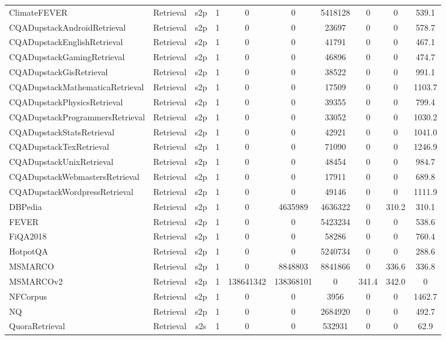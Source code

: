 \documentclass[11pt]{article}
\begin{document}
\begin{table*}[!t]
{\begin{tabular}{l|ccccccccc}
ClimateFEVER & Retrieval & s2p & 1 & 0 & 0 & 5418128 & 0 & 0 & 539.1  \\
CQADupstackAndroidRetrieval & Retrieval & s2p & 1 & 0 & 0 & 23697 & 0 & 0 & 578.7  \\
CQADupstackEnglishRetrieval & Retrieval & s2p & 1 & 0 & 0 & 41791 & 0 & 0 & 467.1  \\
CQADupstackGamingRetrieval & Retrieval & s2p & 1 & 0 & 0 & 46896 & 0 & 0 & 474.7  \\
CQADupstackGisRetrieval & Retrieval & s2p & 1 & 0 & 0 & 38522 & 0 & 0 & 991.1  \\
CQADupstackMathematicaRetrieval & Retrieval & s2p & 1 & 0 & 0 & 17509 & 0 & 0 & 1103.7  \\
CQADupstackPhysicsRetrieval & Retrieval & s2p & 1 & 0 & 0 & 39355 & 0 & 0 & 799.4  \\
CQADupstackProgrammersRetrieval & Retrieval & s2p & 1 & 0 & 0 & 33052 & 0 & 0 & 1030.2  \\
CQADupstackStatsRetrieval & Retrieval & s2p & 1 & 0 & 0 & 42921 & 0 & 0 & 1041.0  \\
CQADupstackTexRetrieval & Retrieval & s2p & 1 & 0 & 0 & 71090 & 0 & 0 & 1246.9  \\
CQADupstackUnixRetrieval & Retrieval & s2p & 1 & 0 & 0 & 48454 & 0 & 0 & 984.7  \\
CQADupstackWebmastersRetrieval & Retrieval & s2p & 1 & 0 & 0 & 17911 & 0 & 0 & 689.8  \\
CQADupstackWordpressRetrieval & Retrieval & s2p & 1 & 0 & 0 & 49146 & 0 & 0 & 1111.9  \\
DBPedia & Retrieval & s2p & 1 & 0 & 4635989 & 4636322 & 0 & 310.2 & 310.1  \\
FEVER & Retrieval & s2p & 1 & 0 & 0 & 5423234 & 0 & 0 & 538.6  \\
FiQA2018 & Retrieval & s2p & 1 & 0 & 0 & 58286 & 0 & 0 & 760.4  \\
HotpotQA & Retrieval & s2p & 1 & 0 & 0 & 5240734 & 0 & 0 & 288.6  \\
MSMARCO & Retrieval & s2p & 1 & 0 & 8848803 & 8841866 & 0 & 336.6 & 336.8  \\
MSMARCOv2 & Retrieval & s2p & 1 & 138641342 & 138368101 & 0 & 341.4 & 342.0 & 0  \\
NFCorpus & Retrieval & s2p & 1 & 0 & 0 & 3956 & 0 & 0 & 1462.7  \\
NQ & Retrieval & s2p & 1 & 0 & 0 & 2684920 & 0 & 0 & 492.7  \\
QuoraRetrieval & Retrieval & s2s & 1 & 0 & 0 & 532931 & 0 & 0 & 62.9  \\

\end{tabular}}
\end{table*}
\end{document}
